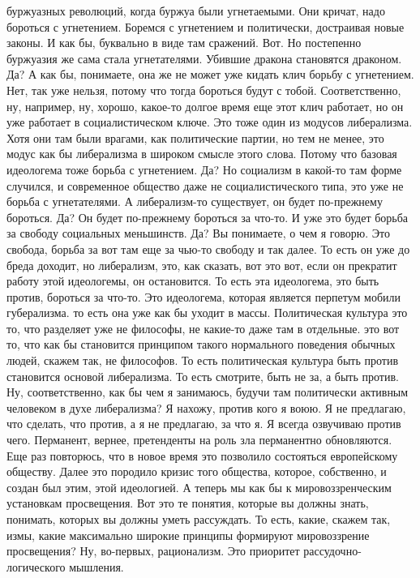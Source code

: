 буржуазных революций, когда буржуа были угнетаемыми. Они кричат, надо бороться с
угнетением. Боремся с угнетением и политически, достраивая новые законы. И как
бы, буквально в виде там сражений. Вот. Но постепенно буржуазия же сама стала
угнетателями. Убившие дракона становятся драконом. Да? А как бы, понимаете, она
же не может уже кидать клич борьбу с угнетением. Нет, так уже нельзя, потому что
тогда бороться будут с тобой. Соответственно, ну, например, ну, хорошо, какое-то
долгое время еще этот клич работает, но он уже работает в социалистическом
ключе. Это тоже один из модусов либерализма. Хотя они там были врагами, как
политические партии, но тем не менее, это модус как бы либерализма в широком
смысле этого слова. Потому что базовая идеологема тоже борьба с угнетением. Да?
Но социализм в какой-то там форме случился, и современное общество даже не
социалистического типа, это уже не борьба с угнетателями. А либерализм-то
существует, он будет по-прежнему бороться. Да? Он будет по-прежнему бороться за
что-то. И уже это будет борьба за свободу социальных меньшинств. Да? Вы
понимаете, о чем я говорю. Это свобода, борьба за вот там еще за чью-то свободу
и так далее. То есть он уже до бреда доходит, но либерализм, это, как сказать,
вот это вот, если он прекратит работу этой идеологемы, он остановится. То есть
эта идеологема, это быть против, бороться за что-то. Это идеологема, которая
является перпетум мобили губерализма. то есть она уже как бы уходит в массы.
Политическая культура это то, что разделяет уже не философы, не какие-то даже
там в отдельные. это вот то, что как бы становится принципом такого нормального
поведения обычных людей, скажем так, не философов. То есть политическая культура
быть против становится основой либерализма. То есть смотрите, быть не за, а быть
против. Ну, соответственно, как бы чем я занимаюсь, будучи там политически
активным человеком в духе либерализма? Я нахожу, против кого я воюю. Я не
предлагаю, что сделать, что против, а я не предлагаю, за что я. Я всегда
озвучиваю против чего. Перманент, вернее, претенденты на роль зла перманентно
обновляются. Еще раз повторюсь, что в новое время это позволило состояться
европейскому обществу. Далее это породило кризис того общества, которое,
собственно, и создан был этим, этой идеологией. А теперь мы как бы к
мировоззренческим установкам просвещения. Вот это те понятия, которые вы должны
знать, понимать, которых вы должны уметь рассуждать. То есть, какие, скажем так,
измы, какие максимально широкие принципы формируют мировоззрение просвещения?
Ну, во-первых, рационализм. Это приоритет рассудочно-логического мышления.
